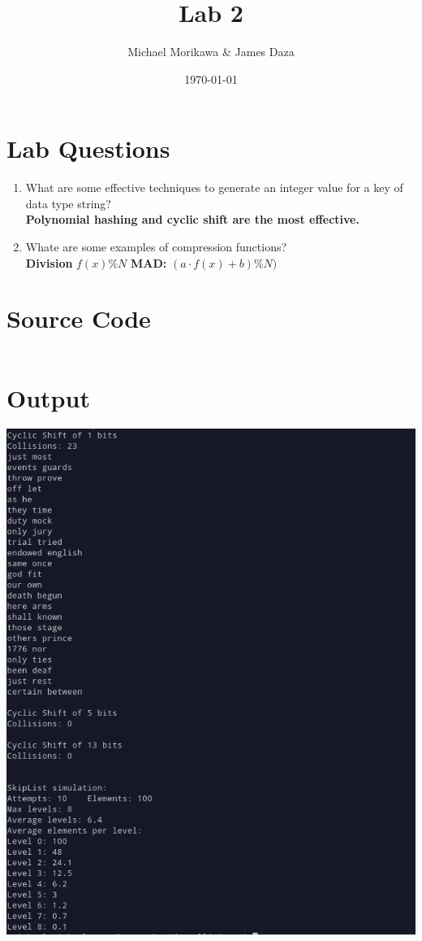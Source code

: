 \documentclass{article}
\title{Lab 2}
\author{Michael Morikawa \& James Daza}
\date{\today}
\begin{document}
    \maketitle
    \section{Lab Questions}
    \begin{enumerate}[label=\textbf{Question \arabic*}]
        \item What are some effective techniques to generate an integer value 
        for a key of data type string?\\
        \textbf{
            Polynomial hashing and cyclic shift are the most effective.
        }
        \item Whate are some examples of compression functions? \\
        \textbf{Division} $f(x)\%N$ \textbf{MAD: }$(a \cdot f(x) + b)\%N)$
    \end{enumerate}

    \section{Source Code}
    \inputminted{c++}{../src/main.cpp}

    \section{Output}
    \includegraphics[scale=0.7]{lab2_output.png}
\end{document}
